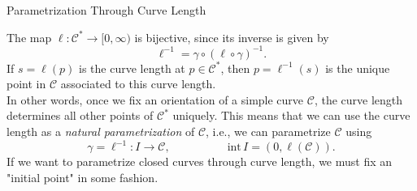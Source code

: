 \documentclass[smaller,hyperref={CJKbookmarks=true}]{beamer}
\begin{document}
\begin{frame}[t]{Parametrization Through Curve Length}
\begin{spacing}{1}
The map $\ell:\mathcal{C}^*\to[0,\infty)$ is bijective, since its inverse is given by
\[\ell^{-1}=\gamma\circ(\ell\circ\gamma)^{-1}.\]
If $s=\ell(p)$ is the curve length at $p\in\mathcal{C}^*$, then $p=\ell^{-1}(s)$ is the unique point in $\mathcal{C}$ associated to this curve length.\\[5pt]
In other words, once we fix an orientation of a simple curve $\mathcal{C}$, the curve
length determines all other points of $\mathcal{C}^*$ uniquely. This means that we can
use the curve length as a \emph{natural parametrization} of $\mathcal{C}$, i.e., we can
parametrize $\mathcal{C}$ using
\[\gamma=\ell^{-1}:I\to\mathcal{C},\qquad
\qquad\quad\text{int}\,I=(0,\ell(\mathcal{C})).\]
If we want to parametrize closed curves through curve length, we must fix
an "initial point" in some fashion.
\end{spacing}
\end{frame}
\end{document}
